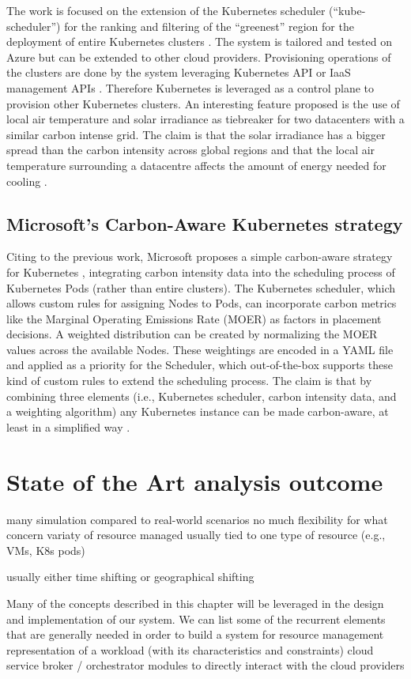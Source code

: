 The work is focused on the extension of the Kubernetes scheduler (``kube-scheduler'') for the ranking and filtering of the ``greenest'' region for the deployment of entire Kubernetes clusters \cite{low_carbon_k8s_scheduler}.
The system is tailored and tested on Azure but can be extended to other cloud providers.
Provisioning  operations of the clusters are done by the system leveraging Kubernetes API or IaaS management APIs \cite{low_carbon_k8s_scheduler}.
Therefore Kubernetes is leveraged as a control plane to provision other Kubernetes clusters.
An interesting feature proposed is the use of local air temperature and solar irradiance as tiebreaker for two datacenters with a similar carbon intense grid. 
The claim is that the solar irradiance has a bigger spread than the carbon intensity across global regions and that the local air temperature surrounding a datacentre affects the amount of energy needed for cooling \cite{low_carbon_k8s_scheduler}. 

\subsection{Microsoft's Carbon-Aware Kubernetes strategy}
\label{sec:microsoft_carbon_aware_k8s}

Citing to the previous work, Microsoft proposes a simple carbon-aware strategy for Kubernetes \cite{microsoft_carbon_aware_k8s}, integrating carbon intensity data into the scheduling process of Kubernetes Pods (rather than entire clusters).
The Kubernetes scheduler, which allows custom rules for assigning Nodes to Pods, can incorporate carbon metrics like the Marginal Operating Emissions Rate (MOER) as factors in placement decisions. 
A weighted distribution can be created by normalizing the MOER values across the available Nodes.
These weightings are encoded in a YAML file and applied as a priority for the Scheduler, which out-of-the-box supports these kind of custom rules to extend the scheduling process.
The claim is that by combining three elements (i.e., Kubernetes scheduler, carbon intensity data, and a weighting algorithm) any Kubernetes instance can be made carbon-aware, at least in a simplified way \cite{microsoft_carbon_aware_k8s}.

\section{State of the Art analysis outcome}




many simulation compared to real-world scenarios
no much flexibility for what concern variaty of resource managed
usually tied to one type of resource (e.g., VMs, K8s pods)

usually either time shifting or geographical shifting


Many of the concepts described in this chapter will be leveraged in the design and implementation of our system. 
We can list some of the recurrent elements that are generally needed in order to build a system for resource management
representation of a workload (with its characteristics and constraints)
cloud service broker / orchestrator
modules to directly interact with the cloud providers

\newpage
